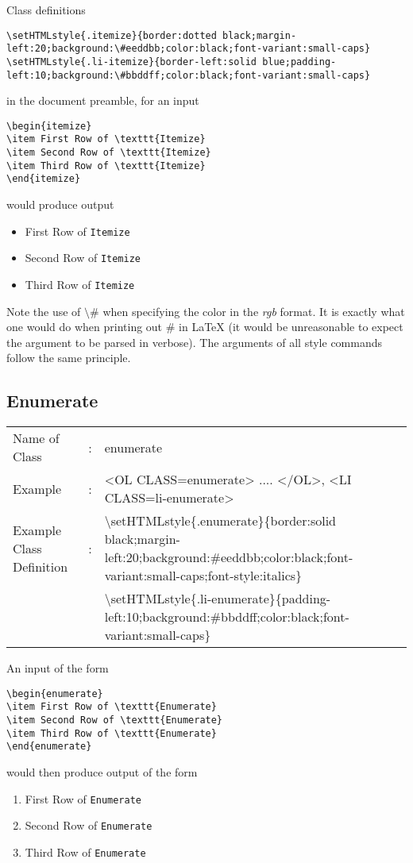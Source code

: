 \documentclass {article}
\begin{document}
Class definitions 
\begin{verbatim}
\setHTMLstyle{.itemize}{border:dotted black;margin-left:20;background:\#eeddbb;color:black;font-variant:small-caps}
\setHTMLstyle{.li-itemize}{border-left:solid blue;padding-left:10;background:\#bbddff;color:black;font-variant:small-caps}
\end{verbatim}
in the document preamble, for an input 
\begin{verbatim}
\begin{itemize}
\item First Row of \texttt{Itemize}
\item Second Row of \texttt{Itemize}
\item Third Row of \texttt{Itemize}
\end{itemize}
\end{verbatim}
would produce output 
\begin{itemize}
\item First Row of \texttt{Itemize}
\item Second Row of \texttt{Itemize}
\item Third Row of \texttt{Itemize}
\end{itemize}
Note the use of $\setminus$\# when specifying the color in the \emph{rgb} format. It is exactly what one would do when printing out \# in \LaTeX{} (it would be unreasonable to expect the argument to be parsed in verbose). The arguments of all style commands follow the same principle.
\subsection{Enumerate}
\begin{tabular}{lll}
Name of Class & : & enumerate\\
Example & : & <OL CLASS=enumerate> .... </OL>, <LI CLASS=li-enumerate>\\
Example Class Definition & : & $\setminus$setHTMLstyle\{.enumerate\}\{border:solid black;margin-left:20;background:\#eeddbb;color:black;font-variant:small-caps;font-style:italics\}\\
 & & $\setminus$setHTMLstyle\{.li-enumerate\}\{padding-left:10;background:\#bbddff;color:black;font-variant:small-caps\}\\
\end{tabular}

An input of the form
\begin{verbatim}
\begin{enumerate}
\item First Row of \texttt{Enumerate}
\item Second Row of \texttt{Enumerate}
\item Third Row of \texttt{Enumerate}
\end{enumerate}
\end{verbatim}
would then produce output of the form\begin{enumerate}
\item First Row of \texttt{Enumerate}
\item Second Row of \texttt{Enumerate}
\item Third Row of \texttt{Enumerate}
\end{enumerate}
\end{document}
